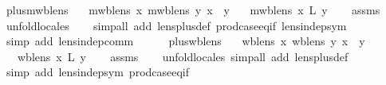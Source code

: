 \begin{isabellebody}
{\isafoldproof}%
%
\isadelimproof
\isanewline
%
\endisadelimproof
\isanewline
{}\isamarkupfalse%
\ plus{\isacharunderscore}mwb{\isacharunderscore}lens{\isacharcolon}\isanewline
\ \ \ {\isachardoublequoteopen}mwb{\isacharunderscore}lens\ x{\isachardoublequoteclose}\ {\isachardoublequoteopen}mwb{\isacharunderscore}lens\ y{\isachardoublequoteclose}\ {\isachardoublequoteopen}x\ {\isasymbowtie}\ y{\isachardoublequoteclose}\isanewline
\ \ \ {\isachardoublequoteopen}mwb{\isacharunderscore}lens\ {\isacharparenleft}x\ {\isacharplus}\isactrlsub L\ y{\isacharparenright}{\isachardoublequoteclose}\isanewline
%
\isadelimproof
\ \ %
\endisadelimproof
%
\isatagproof
{}\isamarkupfalse%
\ assms\isanewline
\ \ \isamarkupfalse%
\ {\isacharparenleft}unfold{\isacharunderscore}locales{\isacharparenright}\isanewline
\ \ \isamarkupfalse%
\ {\isacharparenleft}simp{\isacharunderscore}all\ add{\isacharcolon}\ lens{\isacharunderscore}plus{\isacharunderscore}def\ prod{\isachardot}case{\isacharunderscore}eq{\isacharunderscore}if\ lens{\isacharunderscore}indep{\isacharunderscore}sym{\isacharparenright}\isanewline
\ \ \isamarkupfalse%
\ {\isacharparenleft}simp\ add{\isacharcolon}\ lens{\isacharunderscore}indep{\isacharunderscore}comm{\isacharparenright}\isanewline
{}\isamarkupfalse%
%
\endisatagproof
{\isafoldproof}%
%
\isadelimproof
\isanewline
%
\endisadelimproof
\ \ \ \ \isanewline
{}\isamarkupfalse%
\ plus{\isacharunderscore}wb{\isacharunderscore}lens{\isacharcolon}\isanewline
\ \ \ {\isachardoublequoteopen}wb{\isacharunderscore}lens\ x{\isachardoublequoteclose}\ {\isachardoublequoteopen}wb{\isacharunderscore}lens\ y{\isachardoublequoteclose}\ {\isachardoublequoteopen}x\ {\isasymbowtie}\ y{\isachardoublequoteclose}\isanewline
\ \ \ {\isachardoublequoteopen}wb{\isacharunderscore}lens\ {\isacharparenleft}x\ {\isacharplus}\isactrlsub L\ y{\isacharparenright}{\isachardoublequoteclose}\isanewline
%
\isadelimproof
\ \ %
\endisadelimproof
%
\isatagproof
{}\isamarkupfalse%
\ assms\isanewline
\ \ \isamarkupfalse%
\ {\isacharparenleft}unfold{\isacharunderscore}locales{\isacharcomma}\ simp{\isacharunderscore}all\ add{\isacharcolon}\ lens{\isacharunderscore}plus{\isacharunderscore}def{\isacharparenright}\isanewline
\ \ \isamarkupfalse%
\ {\isacharparenleft}simp\ add{\isacharcolon}\ lens{\isacharunderscore}indep{\isacharunderscore}sym\ prod{\isachardot}case{\isacharunderscore}eq{\isacharunderscore}if{\isacharparenright}\isanewline

\end{isabellebody}
